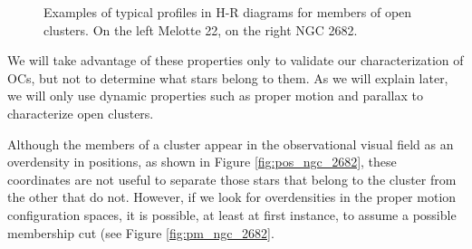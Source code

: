\documentclass[11pt, a4paper, english]{book}
\begin{document}
\begin{figure}[htbp]
\begin{subfigure}{0.9\textwidth}
\begin{subfigure}[t]{0.45\textwidth}
    \end{subfigure}
  \end{subfigure}
  \caption{Examples of typical profiles in H-R diagrams for members of open clusters. On the left Melotte 22, on the right NGC 2682.}
  \label{fig:examples_of_hr_diagrams}
\end{figure}

We will take advantage of these properties only to validate our characterization of OCs,
but not to determine what stars belong to them. As we will explain later,
we will only use dynamic properties such as proper motion and parallax to characterize open clusters.

Although the members of a cluster appear in the observational visual field as an overdensity in positions,
as shown in Figure \ref{fig:pos_ngc_2682},
these coordinates are not useful to separate those stars that belong to the cluster from the other that do not.
However, if we look for overdensities in the proper motion configuration spaces, it is possible, at least at first instance,
to assume a possible membership cut (see Figure \ref{fig:pm_ngc_2682}.
\end{document}
